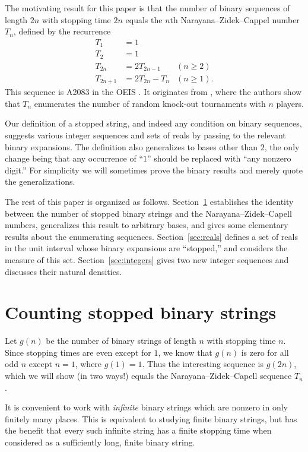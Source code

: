 \documentclass[12pt]{amsart}
\theoremstyle{definition}
\begin{document}
The motivating result for this paper is that the number of binary sequences of
length $2n$ with stopping time $2n$ equals the $n$th Narayana--Zidek--Cappel
number $T_n$, defined by the recurrence
\begin{align*}
    T_1 &= 1 & \\
    T_2 &= 1 & \\
    T_{2n} &= 2 T_{2n - 1} &(n \geq 2)\\
    T_{2n + 1} &= 2 T_{2n} - T_n  &(n \geq 1).
\end{align*}
This sequence is A2083 in the OEIS \cite{oeis}. It originates from
\cite{capell1970knock}, where the authors show that $T_n$ enumerates the number
of random knock-out tournaments with $n$ players.

Our definition of a stopped string, and indeed any condition on binary
sequences, suggests various integer sequences and sets of reals by passing to
the relevant binary expansions. The definition also generalizes to bases other
than $2$, the only change being that any occurrence of ``$1$'' should be
replaced with ``any nonzero digit.'' For simplicity we will sometimes prove the
binary results and merely quote the generalizations.

The rest of this paper is organized as follows. Section~\ref{sec:recs}
establishes the identity between the number of stopped binary strings and the
Narayana--Zidek--Capell numbers, generalizes this result to arbitrary bases,
and gives some elementary results about the enumerating sequences.
Section~\ref{sec:reals} defines a set of reals in the unit interval whose
binary expansions are ``stopped,'' and considers the measure of this set.
Section~\ref{sec:integers} gives two new integer sequences and discusses their
natural densities.

\section{Counting stopped binary strings}
\label{sec:recs}

Let $g(n)$ be the number of binary strings of length $n$ with stopping time
$n$. Since stopping times are even except for $1$, we know that $g(n)$ is zero
for all odd $n$ except $n = 1$, where $g(1) = 1$. Thus the interesting sequence
is $g(2n)$, which we will show (in two ways!) equals the
Narayana--Zidek--Capell sequence $T_n$.

It is convenient to work with \emph{infinite} binary strings which are nonzero
in only finitely many places. This is equivalent to studying finite binary
strings, but has the benefit that every such infinite string has a finite
stopping time when considered as a sufficiently long, finite binary string.
\end{document}
